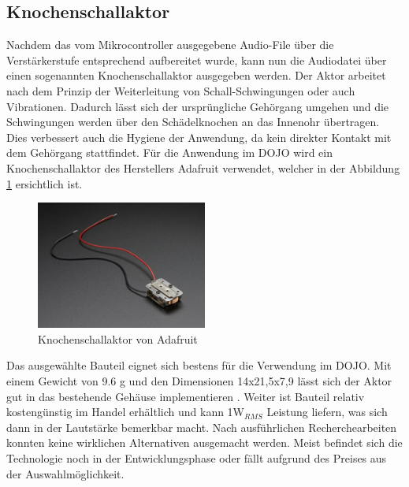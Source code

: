 \subsection{Knochenschallaktor} \label{sec:knochenschallaktor}

Nachdem das vom Mikrocontroller ausgegebene Audio-File über die Verstärkerstufe entsprechend aufbereitet wurde, kann nun die Audiodatei über einen sogenannten Knochenschallaktor ausgegeben werden.
Der Aktor arbeitet nach dem Prinzip der Weiterleitung von Schall-Schwingungen oder auch Vibrationen. Dadurch lässt sich der ursprüngliche Gehörgang umgehen und die Schwingungen werden über den Schädelknochen an das Innenohr übertragen. Dies verbessert auch die Hygiene der Anwendung, da kein direkter Kontakt mit dem Gehörgang stattfindet.\cite{Knochenschall}
Für die Anwendung im DOJO wird ein Knochenschallaktor des Herstellers Adafruit verwendet, welcher in der Abbildung \ref{fig:knochenschallAda} ersichtlich ist.

\begin{figure}[htbp]
	\centering
	\includegraphics[width=0.5\textwidth]{Data/KnochenschallaktorAdafruit1}
	\caption[Knochenschallaktor \cite{BoneConductorAdafruit}]{Knochenschallaktor von Adafruit}
	\label{fig:knochenschallAda}
\end{figure} 

Das ausgewählte Bauteil eignet sich bestens für die Verwendung im DOJO. Mit einem Gewicht von 9.6 g und den Dimensionen 14x21,5x7,9 lässt sich der Aktor gut in das bestehende Gehäuse implementieren \cite{BoneConductorAdafruit}. Weiter ist Bauteil relativ kostengünstig im Handel erhältlich und kann 1W$_{RMS}$ Leistung liefern, was sich dann in der Lautstärke bemerkbar macht. Nach ausführlichen Recherchearbeiten konnten keine wirklichen Alternativen ausgemacht werden. Meist befindet sich die Technologie noch in der Entwicklungsphase oder fällt aufgrund des Preises aus der Auswahlmöglichkeit.